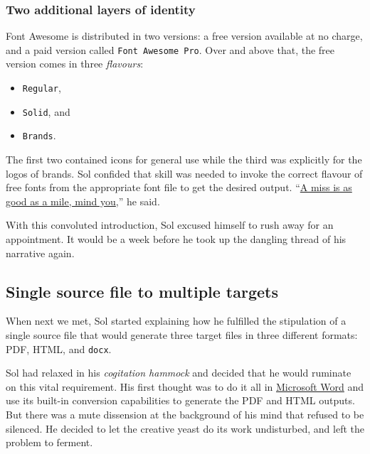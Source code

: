 \documentclass[
  british,
  a4paper,
  rgb,
  dvipsnames,
  svgnames,
  hyphens]{article}
\providecommand{\tightlist}{%
  \setlength{\itemsep}{0pt}\setlength{\parskip}{0pt}}
\begin{document}
\hypertarget{two-additional-layers-of-identity}{%
\subsubsection{Two additional layers of
identity}\label{two-additional-layers-of-identity}}

Font Awesome is distributed in two versions: a free version available at
no charge, and a paid version called \texttt{Font\ Awesome\ Pro}. Over
and above that, the free version comes in three \emph{flavours}:

\begin{itemize}
\tightlist
\item
  \texttt{Regular},
\item
  \texttt{Solid}, and
\item
  \texttt{Brands}.
\end{itemize}

The first two contained icons for general use while the third was
explicitly for the logos of brands. Sol confided that skill was needed
to invoke the correct flavour of free fonts from the appropriate font
file to get the desired output.
``\href{https://idioms.thefreedictionary.com/a+miss+is+as+good+as+a+mile}{A
miss is as good as a mile, mind you},'' he said.

With this convoluted introduction, Sol excused himself to rush away for
an appointment. It would be a week before he took up the dangling thread
of his narrative again.

\hypertarget{single-source-file-to-multiple-targets}{%
\subsection{Single source file to multiple
targets}\label{single-source-file-to-multiple-targets}}

When next we met, Sol started explaining how he fulfilled the
stipulation of a single source file that would generate three target
files in three different formats: PDF, HTML, and \texttt{docx}.

Sol had relaxed in his \emph{cogitation hammock} and decided that he
would ruminate on this vital requirement. His first thought was to do it
all in
\href{https://www.microsoft.com/en-in/microsoft-365/word}{Microsoft
Word} and use its built-in conversion capabilities to generate the PDF
and HTML outputs. But there was a mute dissension at the background of
his mind that refused to be silenced. He decided to let the creative
yeast do its work undisturbed, and left the problem to ferment.
\end{document}
